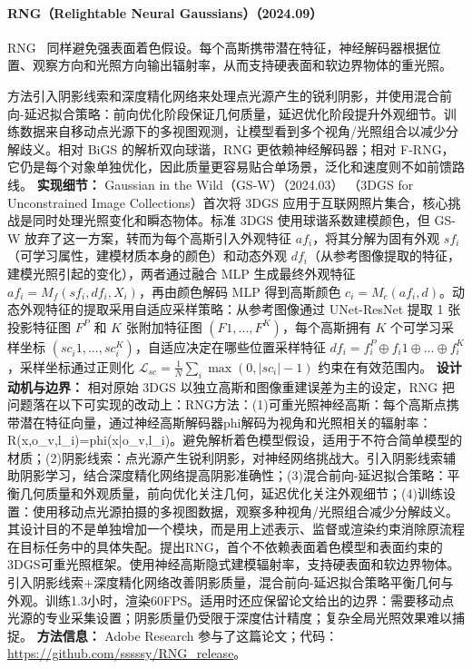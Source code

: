 \paragraph{RNG（Relightable Neural Gaussians）（2024.09）}
RNG~\cite{2409_19702} 同样避免强表面着色假设。每个高斯携带潜在特征，神经解码器根据位置、观察方向和光照方向输出辐射率，从而支持硬表面和软边界物体的重光照。

方法引入阴影线索和深度精化网络来处理点光源产生的锐利阴影，并使用混合前向-延迟拟合策略：前向优化阶段保证几何质量，延迟优化阶段提升外观细节。训练数据来自移动点光源下的多视图观测，让模型看到多个视角/光照组合以减少分解歧义。相对 BiGS 的解析双向球谐，RNG 更依赖神经解码器；相对 F-RNG，它仍是每个对象单独优化，因此质量更容易贴合单场景，泛化和速度则不如前馈路线。
\textbf{实现细节：} Gaussian in the Wild（GS-W）（2024.03） （3DGS for Unconstrained Image Collections）首次将 3DGS 应用于互联网照片集合，核心挑战是同时处理光照变化和瞬态物体。标准 3DGS 使用球谐系数建模颜色，但 GS-W 放弃了这一方案，转而为每个高斯引入外观特征 $af_i$，将其分解为固有外观 $sf_i$（可学习属性，建模材质本身的颜色）和动态外观 $df_i$（从参考图像提取的特征，建模光照引起的变化），两者通过融合 MLP 生成最终外观特征 $af_i = M_f(sf_i, df_i, X_i)$，再由颜色解码 MLP 得到高斯颜色 $c_i = M_c(af_i, d)$。动态外观特征的提取采用自适应采样策略：从参考图像通过 UNet-ResNet 提取 1 张投影特征图 $F^P$ 和 $K$ 张附加特征图 $(F^{}1, ..., F^K)$，每个高斯拥有 $K$ 个可学习采样坐标 $(sc_i^{}1, ..., sc_i^K)$，自适应决定在哪些位置采样特征 $df_i = f_i^P \oplus f_i^{}1 \oplus ... \oplus f_i^K$，采样坐标通过正则化 $\mathcal{L}_{sc} = \frac{1}{N}\sum_i \max(0, |sc_i| - 1)$ 约束在有效范围内。
\textbf{设计动机与边界：} 相对原始 3DGS 以独立高斯和图像重建误差为主的设定，RNG 把问题落在以下可实现的改动上：RNG方法：(1)可重光照神经高斯：每个高斯点携带潜在特征向量，通过神经高斯解码器phi解码为视角和光照相关的辐射率：R(x,o\_v,l\_i)=phi(x|o\_v,l\_i)。避免解析着色模型假设，适用于不符合简单模型的材质；(2)阴影线索：点光源产生锐利阴影，对神经网络挑战大。引入阴影线索辅助阴影学习，结合深度精化网络提高阴影准确性；(3)混合前向-延迟拟合策略：平衡几何质量和外观质量，前向优化关注几何，延迟优化关注外观细节；(4)训练设置：使用移动点光源拍摄的多视图数据，观察多种视角/光照组合减少分解歧义。其设计目的不是单独增加一个模块，而是用上述表示、监督或渲染约束消除原流程在目标任务中的具体失配。提出RNG，首个不依赖表面着色模型和表面约束的3DGS可重光照框架。使用神经高斯隐式建模辐射率，支持硬表面和软边界物体。引入阴影线索+深度精化网络改善阴影质量，混合前向-延迟拟合策略平衡几何与外观。训练1.3小时，渲染60FPS。适用时还应保留论文给出的边界：需要移动点光源的专业采集设置；阴影质量仍受限于深度估计精度；复杂全局光照效果难以捕捉。
\textbf{方法信息：} Adobe Research 参与了这篇论文；代码：\url{https://github.com/sssssy/RNG_release}。
